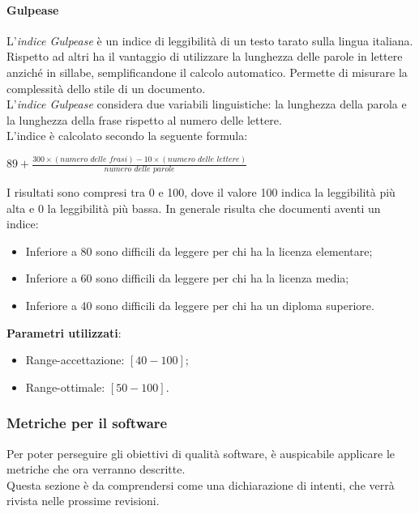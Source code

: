 \paragraph{Gulpease}
L'\textit{indice Gulpease} è un indice di leggibilità di un testo tarato sulla lingua italiana.\\
Rispetto ad altri ha il vantaggio di utilizzare la lunghezza delle parole in lettere anziché in sillabe, semplificandone il calcolo automatico. Permette di misurare la complessità dello stile di un documento.\\
L'\textit{indice Gulpease} considera due variabili linguistiche: la lunghezza della parola e la lunghezza della frase rispetto al numero delle lettere.\\
L'indice è calcolato secondo la seguente formula:
\begin{center}
$89+\frac{300\times(\textit{numero delle frasi})-10\times(\textit{numero delle lettere})}{\textit{numero delle parole}}$
\end{center}
I risultati sono compresi tra 0 e 100, dove il valore 100 indica la leggibilità più alta e 0 la leggibilità più bassa. In generale risulta che documenti aventi un indice:
\begin{itemize}
\item Inferiore a 80 sono difficili da leggere per chi ha la licenza elementare;
\item Inferiore a 60 sono difficili da leggere per chi ha la licenza media;
\item Inferiore a 40 sono difficili da leggere per chi ha un diploma superiore.
\end{itemize}
\textbf{Parametri utilizzati}:
\begin{itemize}
\item Range-accettazione: $[40-100]$;
\item Range-ottimale: $[50-100]$.
\end{itemize}

\subsubsection{Metriche per il software}
Per poter perseguire gli obiettivi di qualità software, è auspicabile applicare le metriche che ora verranno descritte.\\
Questa sezione è da comprendersi come una dichiarazione di intenti, che verrà rivista nelle prossime revisioni.

